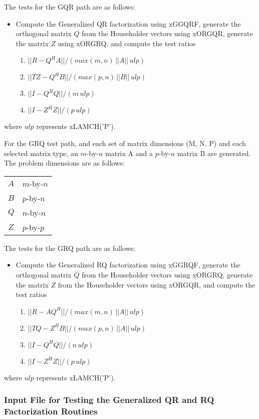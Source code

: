 The tests for the GQR path are as follows:
\begin{itemize}
\item Compute the Generalized QR factorization using xGGQRF, generate
the orthogonal matrix $Q$ from the Householder vectors using xORGQR,
generate the matrix $Z$ using xORGRQ, and compute the test ratios
\begin{enumerate}
\item $|| R - Q^H A || / (max(m,n) \,||A|| \, ulp)$
\item $|| T Z - Q^H B || / (max(p,n) \,||B|| \, ulp)$
\item $|| I - Q^H Q || / (m \, ulp)$
\item $|| I - Z^H Z || / (p \, ulp)$
\end{enumerate}
\end{itemize}
where $ulp$ represents xLAMCH('P').

For the GRQ test path, and each set of matrix dimensions (M, N, P) and each selected matrix
type, an $m$-by-$n$ matrix A and a $p$-by-$n$ matrix B are generated.
The problem dimensions are as follows:
\begin{center}
  \begin{tabular}{ll}
   $A$      &    $m$-by-$n$ \\
   $B$      &    $p$-by-$n$ \\
   $Q$      &    $n$-by-$n$ \\
   $Z$      &    $p$-by-$p$
  \end{tabular}
\end{center}

The tests for the GRQ path are as follows:
\begin{itemize}
\item Compute the Generalized RQ factorization using xGGRQF, generate
the orthogonal matrix $Q$ from the Householder vectors using xORGRQ,
generate the matrix $Z$ from the Householder vectors using xORGQR, and
compute the test ratios
\begin{enumerate}
\item $|| R - A Q^H || / (max(m,n) \, ||A|| \, ulp)$
\item $|| T Q - Z^H B || / (max(p,n) \, ||A|| \, ulp)$
\item $|| I - Q^H Q || / (n \, ulp)$
\item $|| I - Z^H Z || / (p \, ulp)$
\end{enumerate}
\end{itemize}
where $ulp$ represents xLAMCH('P').

\subsubsection{Input File for Testing the Generalized QR and RQ Factorization Routines}


